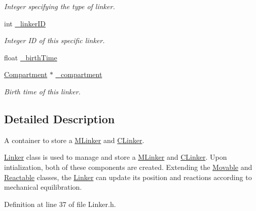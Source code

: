 \begin{DoxyCompactItemize}
\begin{DoxyCompactList}\small\item\em Integer specifying the type of linker. \end{DoxyCompactList}\item 
int \hyperlink{classLinker_a980a8c48b4642a13b409dcdb857028f9}{\+\_\+linker\+I\+D}
\begin{DoxyCompactList}\small\item\em Integer I\+D of this specific linker. \end{DoxyCompactList}\item 
float \hyperlink{classLinker_a5bfc4496cdcfd43db3c801349ae16b74}{\+\_\+birth\+Time}
\item 
\hyperlink{classCompartment}{Compartment} $\ast$ \hyperlink{classLinker_a1392148aae77282b3b651e21abd529a7}{\+\_\+compartment}
\begin{DoxyCompactList}\small\item\em Birth time of this linker. \end{DoxyCompactList}\end{DoxyCompactItemize}


\subsection{Detailed Description}
A container to store a \hyperlink{classMLinker}{M\+Linker} and \hyperlink{classCLinker}{C\+Linker}. 

\hyperlink{classLinker}{Linker} class is used to manage and store a \hyperlink{classMLinker}{M\+Linker} and \hyperlink{classCLinker}{C\+Linker}. Upon intialization, both of these components are created. Extending the \hyperlink{classMovable}{Movable} and \hyperlink{classReactable}{Reactable} classes, the \hyperlink{classLinker}{Linker} can update its position and reactions according to mechanical equilibration. 

Definition at line 37 of file Linker.\+h.




